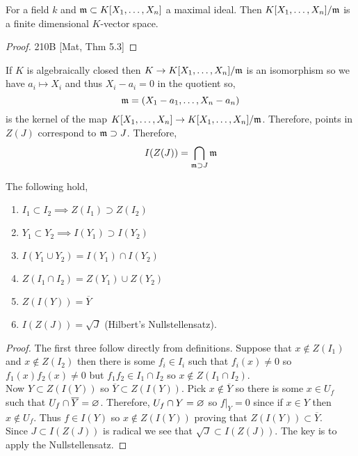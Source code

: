 \documentclass[12pt]{article}
\begin{document}
\begin{prop}[Nullstellensatz]
For a field $k$ and $\mathfrak{m} \subset K[X_1, \dots, X_n]$ a maximal ideal. Then $K[X_1, \dots, X_n]/\mathfrak{m}$ is a finite dimensional $K$-vector space.
\end{prop}

\begin{proof}
210B [Mat, Thm 5.3]
\end{proof}

\begin{cor}
If $K$ is algebraically closed then $K \to K[X_1, \dots, X_n]/\mathfrak{m}$ is an isomorphism so we have $a_i \mapsto X_i$ and thus $X_i - a_i = 0$ in the quotient so,
\[ \mathfrak{m} = (X_1 - a_1, \dots, X_n - a_n) \]
is the kernel of the map $K[X_1, \dots, X_n] \to K[X_1, \dots, X_n]/\mathfrak{m}$. Therefore, points in $Z(J)$ correspond to $\mathfrak{m} \supset J$. Therefore,
\[ I(Z(J)) = \bigcap_{\mathfrak{m} \supset J} \mathfrak{m} \]
\end{cor}

\begin{thm}
The following hold,
\begin{enumerate}
\item $I_1 \subset I_2 \implies Z(I_1) \supset Z(I_2)$
\item $Y_1 \subset Y_2 \implies I(Y_1) \supset I(Y_2)$
\item $I(Y_1 \cup Y_2) = I(Y_1) \cap I(Y_2)$
\item $Z(I_1 \cap I_2) = Z(Y_1) \cup Z(Y_2)$
\item $Z(I(Y)) = \overline{Y}$
\item $I(Z(J)) = \sqrt{J}$ (Hilbert's Nullstellensatz). 
\end{enumerate}
\end{thm}

\begin{proof}
The first three follow directly from definitions. Suppose that $x \notin Z(I_1)$ and $x \notin Z(I_2)$ then there is some $f_i \in I_i$ such that $f_i(x) \neq 0$ so $f_1(x) f_2(x) \neq 0$ but $f_1 f_2 \in I_1 \cap I_2$ so $x \notin Z(I_1 \cap I_2)$. 
\bigskip\\
Now $Y \subset Z(I(Y))$ so $\overline{Y} \subset Z(I(Y))$. Pick $x \notin \overline{Y}$ so there is some $x \in U_f$ such that $U_f \cap \overline{Y} = \varnothing$. Therefore, $U_f \cap Y = \varnothing$ so $f|_Y = 0$ since if $x \in Y$ then $x \notin U_f$. Thus $f \in I(Y)$ so $x \notin Z(I(Y))$ proving that $Z(I(Y)) \subset \overline{Y}$.
\bigskip\\
Since $J \subset I(Z(J))$ is radical we see that $\sqrt{J} \subset I(Z(J))$. The key is to apply the Nullstellensatz.
\end{proof}
\end{document}
